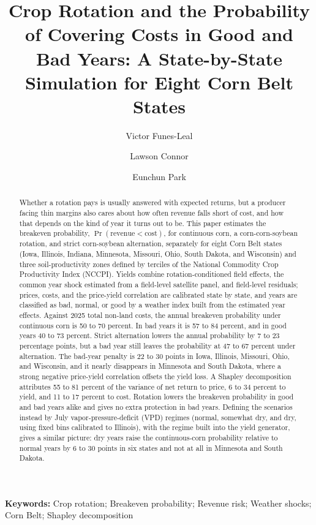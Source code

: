 \documentclass[11pt,letterpaper]{article}
\title{Crop Rotation and the Probability of Covering Costs in Good and Bad Years: A State-by-State Simulation for Eight Corn Belt States}
\author{Victor Funes-Leal}
\author{Lawson Connor}
\author{Eunchun Park}
\affil{Department of Agricultural Economics and Agribusiness, University of Arkansas}
\date{}
\theoremstyle{remark}
\begin{document}
\maketitle

\begin{abstract}
Whether a rotation pays is usually answered with expected returns, but a producer facing thin margins also cares about how often revenue falls short of cost, and how that depends on the kind of year it turns out to be. This paper estimates the breakeven probability, $\Pr(\text{revenue} < \text{cost})$, for continuous corn, a corn-corn-soybean rotation, and strict corn-soybean alternation, separately for eight Corn Belt states (Iowa, Illinois, Indiana, Minnesota, Missouri, Ohio, South Dakota, and Wisconsin) and three soil-productivity zones defined by terciles of the National Commodity Crop Productivity Index (NCCPI). Yields combine rotation-conditioned field effects, the common year shock estimated from a field-level satellite panel, and field-level residuals; prices, costs, and the price-yield correlation are calibrated state by state, and years are classified as bad, normal, or good by a weather index built from the estimated year effects. Against 2025 total non-land costs, the annual breakeven probability under continuous corn is 50 to 70 percent. In bad years it is 57 to 84 percent, and in good years 40 to 73 percent. Strict alternation lowers the annual probability by 7 to 23 percentage points, but a bad year still leaves the probability at 47 to 67 percent under alternation. The bad-year penalty is 22 to 30 points in Iowa, Illinois, Missouri, Ohio, and Wisconsin, and it nearly disappears in Minnesota and South Dakota, where a strong negative price-yield correlation offsets the yield loss. A Shapley decomposition attributes 55 to 81 percent of the variance of net return to price, 6 to 34 percent to yield, and 11 to 17 percent to cost. Rotation lowers the breakeven probability in good and bad years alike and gives no extra protection in bad years. Defining the scenarios instead by July vapor-pressure-deficit (VPD) regimes (normal, somewhat dry, and dry, using fixed bins calibrated to Illinois), with the regime built into the yield generator, gives a similar picture: dry years raise the continuous-corn probability relative to normal years by 6 to 30 points in six states and not at all in Minnesota and South Dakota.
\end{abstract}

\noindent\textbf{Keywords:} Crop rotation; Breakeven probability; Revenue risk; Weather shocks; Corn Belt; Shapley decomposition
\end{document}
